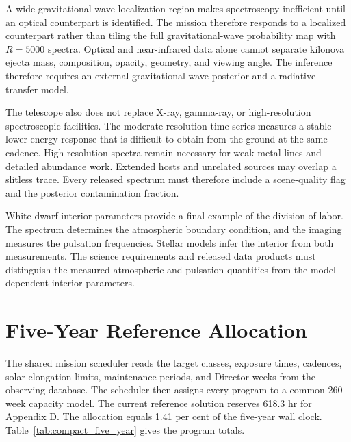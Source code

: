 \documentclass[10pt,onecolumn]{article}
\begin{document}
A wide gravitational-wave localization region makes spectroscopy inefficient
until an optical counterpart is identified. The mission therefore responds to
a localized counterpart rather than tiling the full gravitational-wave
probability map with $R=5000$ spectra. Optical and near-infrared data alone
cannot separate kilonova ejecta mass, composition, opacity, geometry, and
viewing angle. The inference therefore requires an external
gravitational-wave posterior and a radiative-transfer model.

The telescope also does not replace X-ray, gamma-ray, or high-resolution
spectroscopic facilities. The moderate-resolution time series measures a
stable lower-energy response that is difficult to obtain from the ground at
the same cadence. High-resolution spectra remain necessary for weak metal
lines and detailed abundance work. Extended hosts and unrelated sources may
overlap a slitless trace. Every released spectrum must therefore include a
scene-quality flag and the posterior contamination fraction.

White-dwarf interior parameters provide a final example of the division of
labor. The spectrum determines the atmospheric boundary condition, and the
imaging measures the pulsation frequencies. Stellar models infer the interior
from both measurements. The science requirements and released data products
must distinguish the measured atmospheric and pulsation quantities from the
model-dependent interior parameters.

\section{Five-Year Reference Allocation}
\label{sec:compact_schedule}

The shared mission scheduler reads the target classes, exposure times,
cadences, solar-elongation limits, maintenance periods, and Director weeks
from the observing database. The scheduler then assigns every program to a
common 260-week capacity model. The current reference solution reserves 618.3 hr for
Appendix D. The allocation equals 1.41 per cent of the five-year wall clock.
Table~\ref{tab:compact_five_year} gives the program totals.
\end{document}
